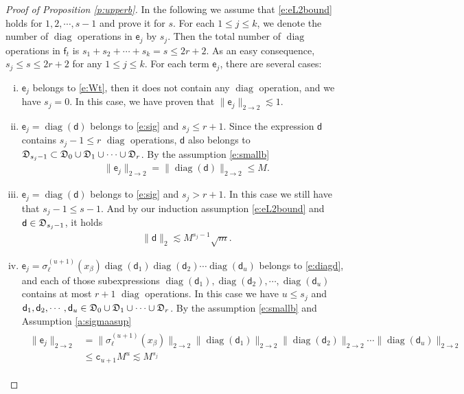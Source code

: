 \documentclass{article}
\numberwithin{equation}{section}
\newcommand{\fc}{{\mathtt c}}
\newcommand{\fD}{{\frak D}}
\newcommand{\sfe}{{\mathsf e}}
\newcommand{\sfd}{{\mathsf d}}
\newcommand{\sff}{{\mathsf f}}
\DeclareMathOperator{\diag}{diag}
\renewcommand{\leq}{\leqslant}
\newcommand{\cob}{\color{darkblue}}
\newcommand{\nc}{\normalcolor}
\newcommand{\1}{\mathds{1}}
\theoremstyle{plain} %
\begin{document}
\begin{proof}[Proof of Proposition \ref{p:upperb}]
In the following we assume that \eqref{e:eL2bound} holds for $1,2,\cdots, s-1$ and prove it for $s$. 
For each $1\leq j\leq k$, we denote the number of $\diag$ operations in $\sfe_j$ by  $s_j$.  Then the total number of $\diag$ operations in $\sff_t$ is $s_1+s_2+\cdots+s_k=s\leq 2r+2$. As an easy consequence, $s_j\leq s\leq 2r+2$ for any $1\leq j\leq k$. For each term $\sfe_j$, there are several cases:
\begin{enumerate}[(i)]
\item  $\sfe_j$ belongs to \eqref{e:Wt}, then it does not contain any $\diag$ operation, and we have $s_j=0$. In this case, we have proven that $\|\sfe_j\|_{2\rightarrow 2}\lesssim 1$.
\item $\sfe_j=\diag(\sfd)$ belongs to \eqref{e:sig} and $s_j\leq r+1$. Since the expression $\sfd$ contains $s_j-1\leq r$ 
$\diag$ operations,  $\sfd$ also belongs to $ \fD_{s_j-1}\subset \fD_{0}\cup\fD_{1}\cup \cdots \cup\fD_{r}$. 
   By the assumption \eqref{e:smallb}
\begin{align*}
\|\sfe_j\|_{2\rightarrow 2}=\|\diag(\sfd)\|_{2\rightarrow 2}\leq M.
\end{align*}
\item $\sfe_j=\diag(\sfd)$ belongs to \eqref{e:sig} and $s_j>r+1$. In this case we still have that $s_j-1\leq s-1$. And by our induction assumption \eqref{e:eL2bound} and $\sfd\in \fD_{s_j-1}$, it holds
\begin{align}\label{e:estd}
   \|\sfd\|_{2} %
   \lesssim  M^{s_j-1}\sqrt m.
\end{align}
\item  $\sfe_j=\sigma_\ell^{(u+1)}(x_\beta)\diag(\sfd_1)\diag(\sfd_2)\cdots \diag(\sfd_u)$ belongs to \eqref{e:diagd}, and each of those subexpressions $\diag(\sfd_1), \diag(\sfd_2), \cdots, \diag(\sfd_u)$ contains at most $r+1$ $\diag$ operations. In this case we have $u\leq s_j$ and $\sfd_1, \sfd_2,\cdots,\sfd_u\in \fD_{0}\cup\fD_{1}\cup \cdots \cup\fD_{r}$. By the assumption \eqref{e:smallb} and Assumption \ref{a:sigmaasup}
\begin{align*}\begin{split}
\|\sfe_j\|_{2\rightarrow 2}
&=\|\sigma_\ell^{(u+1)}(x_\beta)\|_{2\rightarrow 2}\|\diag(\sfd_1)\|_{2\rightarrow 2}\|\diag(\sfd_2)\|_{2\rightarrow 2}\cdots \|\diag(\sfd_u)\|_{2\rightarrow 2}\\
&\leq \fc_{u+1}M^u\lesssim M^{s_j}
\end{split}\end{align*}


\end{enumerate}
\end{proof}
\end{document}
